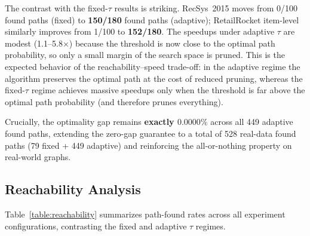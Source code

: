 The contrast with the fixed-$\tau$ results is striking. RecSys~2015 moves from 0/100 found paths (fixed) to \textbf{150/180} found paths (adaptive); RetailRocket item-level similarly improves from 1/100 to \textbf{152/180}. The speedups under adaptive $\tau$ are modest (1.1--5.8$\times$) because the threshold is now close to the optimal path probability, so only a small margin of the search space is pruned. This is the expected behavior of the reachability--speed trade-off: in the adaptive regime the algorithm preserves the optimal path at the cost of reduced pruning, whereas the fixed-$\tau$ regime achieves massive speedups only when the threshold is far above the optimal path probability (and therefore prunes everything).

Crucially, the optimality gap remains \textbf{exactly $0.0000\%$} across all 449 adaptive found paths, extending the zero-gap guarantee to a total of 528 real-data found paths (79 fixed + 449 adaptive) and reinforcing the all-or-nothing property on real-world graphs.

\subsection{Reachability Analysis}

Table~\ref{table:reachability} summarizes path-found rates across all experiment configurations, contrasting the fixed and adaptive $\tau$ regimes.

\begin{table}[htbp]
\centering
\small
\renewcommand{\arraystretch}{1.3}
\caption[Reachability summary]{Path-found rates under fixed and adaptive $\tau$ regimes.}
\label{table:reachability}
\end{table}

